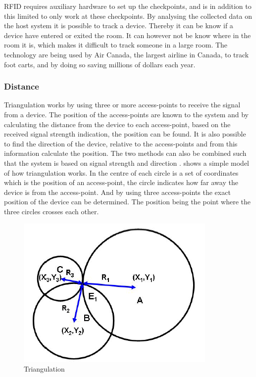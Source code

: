RFID requires auxiliary hardware to set up the checkpoints, and is in addition to this limited to only work at these checkpoints. By analysing the collected data on the host system it is possible to track a device. Thereby it can be know if a device have entered or exited the room. It can however not be know where in the room it is, which makes it difficult to track someone in a large room.
The technology are being used by Air Canada, the largest airline in Canada, to track foot carts, and by doing so saving millions of dollars each year\cite{RFIDjournal}.

\subsubsection*{Distance}
Triangulation works by using three or more access-points to receive the signal from a device. The position of the access-points are known to the system and by calculating the distance from the device to each access-point, based on the received signal strength indication, the position can be found. It is also possible to find the direction of the device, relative to the access-points and from this information calculate the position. The two methods can also be combined such that the system is based on signal strength and direction \cite{Triangulation}.
 shows a simple model of how triangulation works. In the centre of each circle is a set of coordinates which is the position of an access-point, the circle indicates how far away the device is from the access-point. And by using three access-points the exact position of the device can be determined. The position being the point where the three circles crosses each other.
\begin{figure}[ht]
	\begin{center}
		\includegraphics[scale=1]{graphics/triangulation.png}
		\caption{Triangulation\cite{Triangualtion}}
		\label{fig:triangulation}
	\end{center}
\end{figure}


